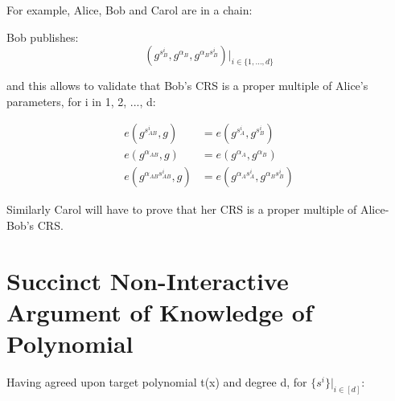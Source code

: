 \documentclass[a4paper,11pt]{article}
\begin{document}
For  example, Alice, Bob and Carol are in a chain:

Bob publishes: 
\begin{displaymath}
(g^{s_B^i}, g^{\alpha_B}, g^{\alpha_B{s_B^i}}) |_{i \in \{1, ... , d\}}
\end{displaymath}

and this allows to validate that Bob's CRS is a proper multiple of Alice's parameters, for i in 1, 2, ..., d:

\begin{displaymath}
\begin{split}
e(g^{s_{AB}^i}, g)  &= e(g^{s_A^i},g^{s_B^i} ) \\
e(g^{{\alpha}_{AB}}, g) &= e(g^{\alpha_A}, g^{\alpha_B}) \\
e(g^{{\alpha}_{AB}{s_{AB}^i}}, g) &= e(g^{\alpha_A s_A^i}, g^{\alpha_B s_B^i}) 
\end{split}
\end{displaymath}

Similarly Carol will have to prove that her CRS is a proper multiple of Alice-Bob’s CRS.

\section{Succinct Non-Interactive Argument of Knowledge of Polynomial}

Having agreed upon target polynomial t(x) and degree d,  for $\{s^i\}|_{i \in [d]}$: 
\end{document}
